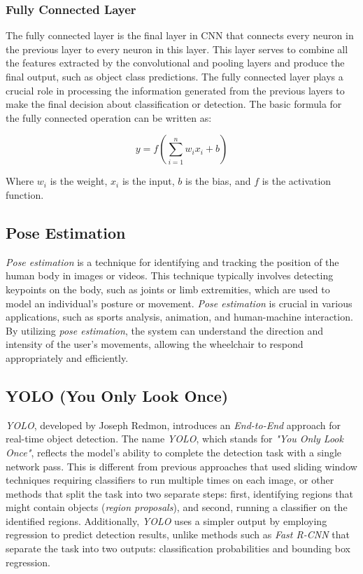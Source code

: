 \vspace{5pt}
\subsubsection{Fully Connected Layer}
\label{subsubsec:Fully Connected Layer}

The fully connected layer is the final layer in CNN that connects every neuron in the previous layer to every neuron in this layer. This layer serves to combine all the features extracted by the convolutional and pooling layers and produce the final output, such as object class predictions. The fully connected layer plays a crucial role in processing the information generated from the previous layers to make the final decision about classification or detection. The basic formula for the fully connected operation can be written as:

\begin{equation}
  y = f\left(\sum_{i=1}^{n} w_i x_i + b\right)
\end{equation}

Where \( w_i \) is the weight, \( x_i \) is the input, \( b \) is the bias, and \( f \) is the activation function.

\subsection{Pose Estimation}
\label{subsec:Pose Estimation}

\emph{Pose estimation} is a technique for identifying and tracking the position of the human body in images or videos. This technique typically involves detecting keypoints on the body, such as joints or limb extremities, which are used to model an individual's posture or movement. \emph{Pose estimation} is crucial in various applications, such as sports analysis, animation, and human-machine interaction. By utilizing \emph{pose estimation}, the system can understand the direction and intensity of the user's movements, allowing the wheelchair to respond appropriately and efficiently.

\subsection{YOLO (You Only Look Once)}
\label{subsec:YOLO}

\emph{YOLO}, developed by Joseph Redmon, introduces an \emph{End-to-End} approach for real-time object detection. The name \emph{YOLO}, which stands for \emph{"You Only Look Once"}, reflects the model's ability to complete the detection task with a single network pass. This is different from previous approaches that used sliding window techniques requiring classifiers to run multiple times on each image, or other methods that split the task into two separate steps: first, identifying regions that might contain objects (\emph{region proposals}), and second, running a classifier on the identified regions. Additionally, \emph{YOLO} uses a simpler output by employing regression to predict detection results, unlike methods such as \emph{Fast R-CNN} that separate the task into two outputs: classification probabilities and bounding box regression.

